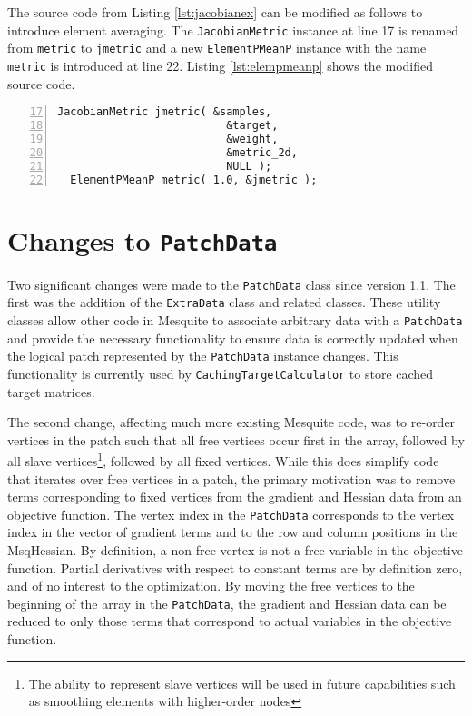 \documentclass{article}
\begin{document}
The source code from Listing \ref{lst:jacobianex} can be modified as follows to introduce element averaging.  The \texttt{JacobianMetric} instance at line 17 is renamed from \texttt{metric} to \texttt{jmetric} and a new \texttt{ElementPMeanP} instance with the name \texttt{metric} is introduced at line 22.  Listing \ref{lst:elempmeanp} shows the modified source code.

\begin{lstlisting}[caption={Averaging Sample-Based Metrics Over Elements},label={lst:elempmeanp},numbers=left,firstnumber=17] 
  JacobianMetric jmetric( &samples,
                          &target,
                          &weight,
                          &metric_2d,
                          NULL );
  ElementPMeanP metric( 1.0, &jmetric );
\end{lstlisting}


\appendix

\section{Changes to \texttt{PatchData}}

Two significant changes were made to the \texttt{PatchData} class since version 1.1.  The first was the addition of the \texttt{ExtraData} class and related classes.  These utility classes allow other code in Mesquite to associate arbitrary data with a \texttt{PatchData} and provide the necessary functionality to ensure data is correctly updated when the logical patch represented by the \texttt{PatchData} instance changes.  This functionality is currently used by \texttt{CachingTargetCalculator} to store cached target matrices.

The second change, affecting much more existing Mesquite code, was to re-order vertices in the patch such that all free vertices occur first in the array, followed by all slave vertices\footnote{The ability to represent slave vertices will be used in future capabilities such as smoothing elements with higher-order nodes}, followed by all fixed vertices.  While this does simplify code that iterates over free vertices in a patch, the primary motivation was to remove terms corresponding to fixed vertices from the gradient and Hessian data from an objective function.  The vertex index in the \texttt{PatchData} corresponds to the vertex index in the vector of gradient terms and to the row and column positions in the MsqHessian.  By definition, a non-free vertex is not a free variable in the objective function.  Partial derivatives with respect to constant terms are by definition zero, and of no interest to the optimization.  By moving the free vertices to the beginning of the array in the \texttt{PatchData}, the gradient and Hessian data can be reduced to only those terms that correspond to actual variables in the objective function.
\end{document}
